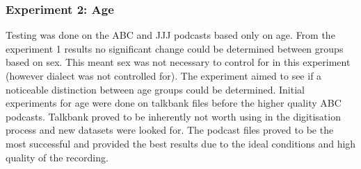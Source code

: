 \subsubsection{Experiment 2: Age}
Testing was done on the ABC and JJJ podcasts based only on age. From the experiment 1 results no significant change could be determined between groups based on sex. This meant sex was not necessary to control for in this experiment (however dialect was not controlled for). The experiment aimed to see if a noticeable distinction between age groups could be determined. Initial experiments for age were done on talkbank files before the higher quality ABC podcasts. Talkbank proved to be inherently not worth using in the digitisation process and new datasets were looked for. The podcast files proved to be the most successful and provided the best results due to the ideal conditions and high quality of the recording. \\







